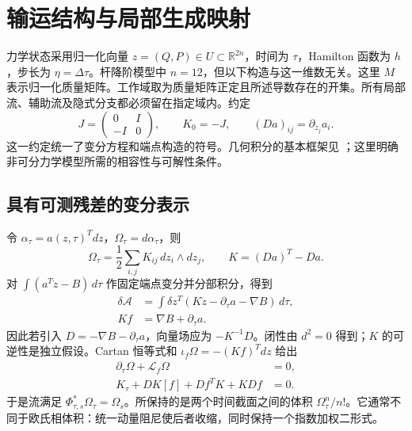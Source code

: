 \section{输运结构与局部生成映射}
\label{sec:theory}

力学状态采用归一化向量 $z=(Q,P)\in U\subset\mathbb R^{2n}$，时间为 $\tau$，Hamilton 函数为 $h$，步长为 $\eta=\Delta\tau$。杆降阶模型中 $n=12$，但以下构造与这一维数无关。这里 $M$ 表示归一化质量矩阵。工作域取为质量矩阵正定且所述导数存在的开集。所有局部流、辅助流及隐式分支都必须留在指定域内。约定
\begin{equation}
 J=\begin{pmatrix}0&I\\-I&0\end{pmatrix},\qquad K_0=-J,
 \qquad (Da)_{ij}=\partial_{z_j}a_i .
 \label{eq:th-conventions}
\end{equation}
这一约定统一了变分方程和端点构造的符号。几何积分的基本框架见 \citet{FengQin2010,Hairer2006}；这里明确非可分力学模型所需的相容性与可解性条件。

\subsection{具有可测残差的变分表示}
令 $\alpha_\tau=a(z,\tau)^T dz$，$\Omega_\tau=d\alpha_\tau$，则
\begin{equation}
 \Omega_\tau=\frac12\sum_{i,j}K_{ij}\,dz_i\wedge dz_j,
 \qquad K=(Da)^T-Da .
 \label{eq:th-form}
\end{equation}
对 $\int(a^T\dot z-B)\,d\tau$ 作固定端点变分并分部积分，得到
\begin{equation}
 \begin{aligned}
 \delta\mathcal A&=\int\delta z^T(K\dot z-\partial_\tau a-\nabla B)\,d\tau,\\
 Kf&=\nabla B+\partial_\tau a .
\end{aligned}
 \label{eq:th-variation}
\end{equation}
因此若引入 $D=-\nabla B-\partial_\tau a$，向量场应为 $-K^{-1}D$。闭性由 $d^2=0$ 得到；$K$ 的可逆性是独立假设。Cartan 恒等式和 $\iota_f\Omega=-(Kf)^Tdz$ 给出
\begin{equation}
 \begin{aligned}
 \partial_\tau\Omega+\mathcal L_f\Omega&=0,\\
 K_\tau+DK[f]+Df^TK+KDf&=0.
\end{aligned}
 \label{eq:th-compatibility}
\end{equation}
于是流满足 $\Phi_{\tau,s}^*\Omega_\tau=\Omega_s$。所保持的是两个时间截面之间的体积 $\Omega_\tau^n/n!$。它通常不同于欧氏相体积：统一动量阻尼使后者收缩，同时保持一个指数加权二形式。

